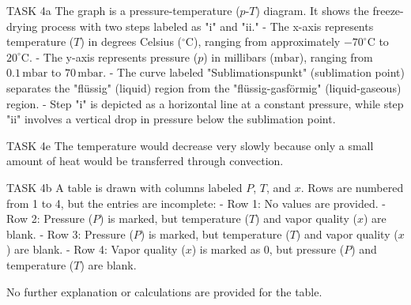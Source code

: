 TASK 4a  
The graph is a pressure-temperature (\( p \)-\( T \)) diagram. It shows the freeze-drying process with two steps labeled as "i" and "ii."  
- The x-axis represents temperature (\( T \)) in degrees Celsius (\( ^\circ \text{C} \)), ranging from approximately \(-70^\circ \text{C}\) to \( 20^\circ \text{C}\).  
- The y-axis represents pressure (\( p \)) in millibars (\( \text{mbar} \)), ranging from \( 0.1 \, \text{mbar} \) to \( 70 \, \text{mbar} \).  
- The curve labeled "Sublimationspunkt" (sublimation point) separates the "flüssig" (liquid) region from the "flüssig-gasförmig" (liquid-gaseous) region.  
- Step "i" is depicted as a horizontal line at a constant pressure, while step "ii" involves a vertical drop in pressure below the sublimation point.  

TASK 4e  
The temperature would decrease very slowly because only a small amount of heat would be transferred through convection.  

TASK 4b  
A table is drawn with columns labeled \( P \), \( T \), and \( x \). Rows are numbered from 1 to 4, but the entries are incomplete:  
- Row 1: No values are provided.  
- Row 2: Pressure (\( P \)) is marked, but temperature (\( T \)) and vapor quality (\( x \)) are blank.  
- Row 3: Pressure (\( P \)) is marked, but temperature (\( T \)) and vapor quality (\( x \)) are blank.  
- Row 4: Vapor quality (\( x \)) is marked as \( 0 \), but pressure (\( P \)) and temperature (\( T \)) are blank.  

No further explanation or calculations are provided for the table.